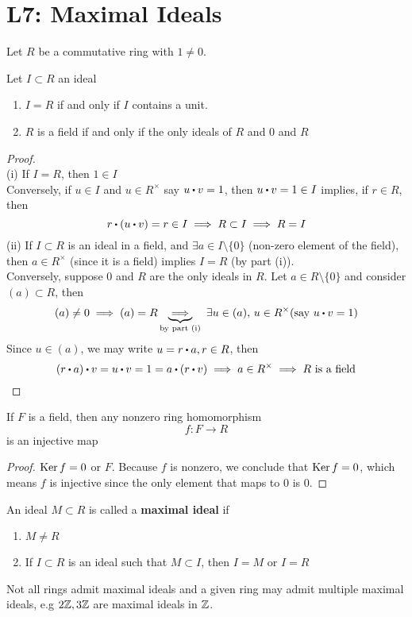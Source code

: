 \documentclass[../Main.tex]{subfiles}
\begin{document}
\chapter{L7: Maximal Ideals}
Let $R$ be a commutative ring with $1\ne 0$.
\begin{prop}[title = Ideals containing units]
	Let $I\subset R$ an ideal
	\begin{enumerate}
		\item $I=R$ if and only if $I$ contains a unit.
		\item $R$ is a field if and only if the only ideals of $R$ and $0$ and $R$
	\end{enumerate}
\end{prop}
\begin{proof}~\\
	(i) If $I=R$, then $1\in I$\\
	Conversely, if $u\in I$ and $u\in R^\times$ say $u\rdot v=1$, then $u\rdot v=1\in I$ implies, if $r \in R$, then 
	\[r\rdot (u\rdot v)=r\in I \implies R\subset I \implies R=I\]
	(ii) If $I\subset R$ is an ideal in a field, and $\exists a \in I \setminus \{0\}$ (non-zero element of the field), then $a\in R^\times$ (since it is a field) implies $I=R$ (by part (i)).\\
	Conversely, suppose $0$ and $R$ are the only ideals in $R$. Let $a\in R\setminus \{0\}$ and consider $(a)\subset R$, then
	\[(a)\ne 0 \implies (a)=R \underbrace{\implies}_{\text{by part (i)}} \,\,\exists u\in (a), \, u \in R^\times (\text{say } u\rdot v=1)\]
	Since $u\in (a)$, we may write $u=r\rdot a, r\in R$, then
	\[(r\rdot a)\rdot v=u\rdot v=1=a\rdot (r\rdot v)\implies a\in R^\times \implies R \text{ is a field}\qedhere\]
\end{proof}
\begin{crl}[title = Homomorphism from field to ring is injective]
	If $F$ is a field, then any nonzero ring homomorphism
	\[f: F\to R\]
	is an injective map
\end{crl}
\begin{proof}
	$\operatorname{Ker} f =0$ or $F$. Because $f$ is nonzero, we conclude that $\operatorname{Ker} f =0$, which means $f$ is injective since the only element that maps to $0$ is $0$.
\end{proof}
\begin{dfn}[title = Maximal Ideal]
	An ideal $M\subset R$ is called a \textbf{maximal ideal} if
	\begin{enumerate}
		\item $M\ne R$
		\item If $I\subset R$ is an ideal such that $M\subset I$, then $I=M$ or $I=R$
	\end{enumerate}
\end{dfn}
Not all rings admit maximal ideals and a given ring may admit multiple maximal ideals, e.g $2\mathbb{Z},3\mathbb{Z}$ are maximal ideals in $\mathbb{Z}$.
\newpage
\end{document}
